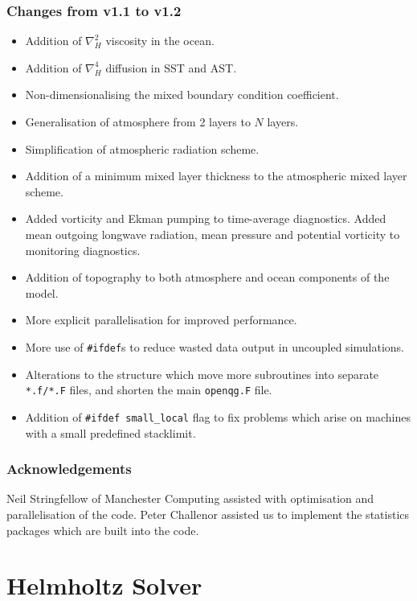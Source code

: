 \documentclass[11pt, a4paper,twoside]{article}
\numberwithin{equation}{section}
\begin{document}
\subsubsection{Changes from v1.1 to v1.2}
\begin{itemize}
\item Addition of $\nabla_H^2$ viscosity in the ocean.
\item Addition of $\nabla_H^4$ diffusion in SST and AST.
\item Non-dimensionalising the mixed boundary condition coefficient.
\item Generalisation of atmosphere from 2 layers to $N$ layers.
\item Simplification of atmospheric radiation scheme.
\item Addition of a minimum mixed layer thickness to the atmospheric mixed layer scheme.
\item Added vorticity and Ekman pumping to time-average diagnostics. Added mean outgoing longwave radiation, mean pressure and potential vorticity to monitoring diagnostics.
\item Addition of topography to both atmosphere and ocean  components of the model.
\item More explicit parallelisation for improved performance.
\item More use of \verb=#ifdef=s to reduce wasted data output in uncoupled simulations.
\item Alterations to the structure which move more subroutines into separate \verb=*.f/*.F= files, and shorten the main \verb=openqg.F= file.
\item Addition of \verb=#ifdef small_local= flag to fix problems which arise on machines with a small predefined stacklimit.
\end{itemize}

\subsubsection*{Acknowledgements}
Neil Stringfellow of Manchester Computing assisted with optimisation and parallelisation of the code.
Peter Challenor assisted us to implement the statistics packages which are built into the code.

\section{Helmholtz Solver}
\end{document}
